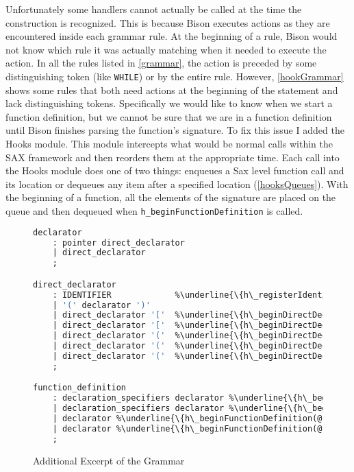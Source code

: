 \documentclass[12pt]{report}
\begin{document}
Unfortunately some handlers cannot actually be called at the time the construction is recognized. This 
is because Bison executes actions as they are encountered inside each grammar rule. At the 
beginning of a rule, Bison would not know which rule it was actually matching when it needed to 
execute the action. In all the rules listed in \autoref{grammar}, the action is preceded by some 
distinguishing token (like \lstinline{WHILE}) or by the entire rule. However, \autoref{hookGrammar} 
shows some rules that both need actions at the beginning of the statement and lack distinguishing 
tokens. Specifically we would like to know when we start a function definition, but we cannot be sure that 
we are in a function definition until Bison finishes parsing the function's signature. To fix this issue I 
added the Hooks module. This module intercepts what would be normal calls within the SAX framework 
and then reorders them at the appropriate time. Each call into the Hooks module does one of two things: 
enqueues a Sax level function call and its location or dequeues any item after a specified location 
(\autoref{hooksQueues}). With the beginning of a function, all the elements of the signature are placed 
on the queue and then dequeued when \lstinline{h_beginFunctionDefinition} is called. 


\begin{figure}
\begin{lstlisting}[language=Caml, escapechar=\%]
declarator
	: pointer direct_declarator
	| direct_declarator
	;

direct_declarator
	: IDENTIFIER			 %\underline{\{h\_registerIdentifier(@\$);\}}%
	| '(' declarator ')'
	| direct_declarator '['  %\underline{\{h\_beginDirectDeclarator(@1);\}}% constant_expression ']'	 %\underline{\{h\_endDirectDeclarator(@\$);\}}%
	| direct_declarator '['  %\underline{\{h\_beginDirectDeclarator(@1);\}}% ']'						%\underline{\{h\_endDirectDeclarator(@\$);\}}%
	| direct_declarator '('  %\underline{\{h\_beginDirectDeclarator(@1);\}}% parameter_type_list ')'	%\underline{\{h\_endDirectDeclarator(@\$);\}}%
	| direct_declarator '('  %\underline{\{h\_beginDirectDeclarator(@1);\}}% identifier_list ')'		%\underline{\{h\_endDirectDeclarator(@\$);\}}%
	| direct_declarator '('  %\underline{\{h\_beginDirectDeclarator(@1);\}}% ')'						%\underline{\{h\_endDirectDeclarator(@\$);\}}%
	;

function_definition
	: declaration_specifiers declarator %\underline{\{h\_beginFunctionDefinition(@2);\}}% declaration_list compound_statement %\underline{\{endFunctionDefinition(@\$);\}}%
	| declaration_specifiers declarator %\underline{\{h\_beginFunctionDefinition(@2);\}}%} compound_statement %\underline{\{endFunctionDefinition(@\$);\}}%
	| declarator %\underline{\{h\_beginFunctionDefinition(@1);\}}% declaration_list compound_statement %\underline{\{endFunctionDefinition(@\$);\}}%
	| declarator %\underline{\{h\_beginFunctionDefinition(@1);\}}% compound_statement %\underline{\{endFunctionDefinition(@\$);\}}
	;
\end{lstlisting}
\caption{Additional Excerpt of the Grammar}
\label{hookGrammar}
\end{figure}
\end{document}

